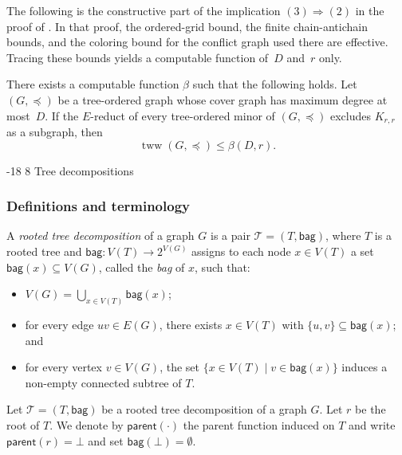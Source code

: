 \documentclass[1p,number,11pt]{elsarticle}
\makeatletter
\renewcommand\subsection{\@startsection{subsection}{2}{\z@}%
  {-18\p@ \@plus -4\p@ \@minus -4\p@}%
  {8\p@ \@plus 4\p@ \@minus 4\p@}%
  {\normalfont\normalsize\bfseries}}
\theoremstyle{plain}
\newcommand{\bag}{\mathsf{bag}}
\newcommand{\parent}{\mathsf{parent}}
\renewcommand{\leq}{\leqslant}
\makeatother
\begin{document}
The following is the constructive part of the  implication
$(3)\Rightarrow(2)$ in the proof of
.
In that proof, 
the ordered-grid bound, the finite chain-antichain bounds, and the coloring
bound for the conflict graph used there are effective. Tracing these bounds
yields a computable function of~$D$ and~$r$ only.

\begin{lemma}\label{lem:effective-bounded-degree-covergraph-original}
There exists a computable function $\beta$ such that the following holds.
Let $(G,\preceq)$ be a tree-ordered graph whose cover graph has maximum
degree at most~$D$.  If the $E$-reduct of every tree-ordered minor of
$(G,\preceq)$ excludes $K_{r,r}$ as a subgraph, then
\[
   \operatorname{tww}(G,\preceq)\leq\beta(D,r).
\]
\end{lemma}


\subsection{Tree decompositions}
\label{sec:tree-dec}
\subsubsection{Definitions and terminology}
A \emph{rooted tree decomposition} of a graph $G$ is a pair $\mathcal T=(T,\bag)$,
where $T$ is a rooted tree and
$\bag\colon V(T)\to 2^{V(G)}$
assigns to each node $x\in V(T)$ a set $\bag(x)\subseteq V(G)$, called the \emph{bag} of $x$, such that:
\begin{itemize}
    \item
    $
    V(G)=\bigcup_{x\in V(T)} \bag(x)$;
    
    \item for every edge $uv\in E(G)$, there exists $x\in V(T)$ with $\{u,v\}\subseteq \bag(x)$; and 
    \item for every vertex $v\in V(G)$, the set    
    $\{x\in V(T)\mid v\in \bag(x)\}$
    induces a non-empty connected subtree of $T$.
\end{itemize}

Let $\mathcal T=(T,\bag)$ be a rooted tree decomposition of a graph $G$.
Let $r$ be the root of $T$.
We denote by $\parent(\cdot)$ the parent function induced on $T$ and write $\parent(r)=\bot$ and set $\bag(\bot)=\emptyset$.

\pagebreak
\end{document}
